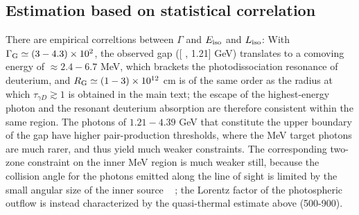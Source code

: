 \documentclass[prd,twocolumn,amsmath,amssymb,aps,linenumbers]{revtex4-2} %
\providecommand{\DIFaddtex}[1]{{\protect\color{blue} \sf #1}} %
\providecommand{\DIFdeltex}[1]{{\protect\color{red} \scriptsize #1}} %
\providecommand{\DIFaddbegin}{} %
\providecommand{\DIFaddend}{} %
\providecommand{\DIFdelbegin}{} %
\providecommand{\DIFdelend}{} %
\providecommand{\DIFadd}[1]{\texorpdfstring{\DIFaddtex{#1}}{#1}} %
\providecommand{\DIFdel}[1]{\texorpdfstring{\DIFdeltex{#1}}{}} %
\newcommand{\DIFscaledelfig}{0.5}
\newlength{\DIFdelgraphicswidth} %
\newlength{\DIFdelgraphicsheight} %
\newcommand{\DIFaddincludegraphics}[2][]{{\color{blue}\fbox{\DIFOincludegraphics[#1]{#2}}}} %
\newcommand{\DIFdelincludegraphics}[2][]{%
\sbox{\DIFdelgraphicsbox}{\DIFOincludegraphics[#1]{#2}}%
\settoboxwidth{\DIFdelgraphicswidth}{\DIFdelgraphicsbox} %
\settoboxtotalheight{\DIFdelgraphicsheight}{\DIFdelgraphicsbox} %
\scalebox{\DIFscaledelfig}{%
\parbox[b]{\DIFdelgraphicswidth}{\usebox{\DIFdelgraphicsbox}\\[-\baselineskip] \rule{\DIFdelgraphicswidth}{0em}}\llap{\resizebox{\DIFdelgraphicswidth}{\DIFdelgraphicsheight}{%
\setlength{\unitlength}{\DIFdelgraphicswidth}%
\begin{picture}(1,1)%
\thicklines\linethickness{2pt} %
{\color[rgb]{1,0,0}\put(0,0){\framebox(1,1){}}}%
{\color[rgb]{1,0,0}\put(0,0){\line( 1,1){1}}}%
{\color[rgb]{1,0,0}\put(0,1){\line(1,-1){1}}}%
\end{picture}%
}\hspace*{3pt}}} %
} %
\DeclareRobustCommand{\DIFaddbegin}{\DIFOaddbegin \let\includegraphics\DIFaddincludegraphics} %
\DeclareRobustCommand{\DIFaddend}{\DIFOaddend \let\includegraphics\DIFOincludegraphics} %
\DeclareRobustCommand{\DIFdelbegin}{\DIFOdelbegin \let\includegraphics\DIFdelincludegraphics} %
\DeclareRobustCommand{\DIFdelend}{\DIFOaddend \let\includegraphics\DIFOincludegraphics} %
\begin{document}
\DIFdelbegin \subsection{\DIFdel{Estimation based on statistical correlation}}
\addtocounter{subsection}{-1}%
\DIFdel{There are empirical correltions between $\Gamma$ and $E_{\rm iso}$ and $L_{\rm iso}$:
}\DIFdelend \DIFaddbegin \DIFadd{With $\Gamma_{\rm G}\simeq(3-4.3)\times10^{2}$, the observed gap (}[\DIFadd{0.62, 1.21}] \DIFadd{GeV) translates to a comoving energy of $\approx2.4-6.7$ MeV, which brackets the photodissociation resonance of deuterium, and $R_{\rm G}\simeq(1-3)\times10^{12}$ cm is of the same order as the radius at which $\tau_{\gamma D}\gtrsim1$ is obtained in the main text; the escape of the highest-energy photon and the resonant deuterium absorption are therefore consistent within the same region. The photons of $1.21-4.39$ GeV that constitute the upper boundary of the gap have higher pair-production thresholds, where the MeV target photons are much rarer, and thus yield much weaker constraints. The corresponding two-zone constraint on the inner MeV region is much weaker still, because the collision angle for the photons emitted along the line of sight is limited by the small angular size of the inner source \mbox{%
\citep{2011ApJ...726L...2Z}}\hskip0pt%
; the Lorentz factor of the photospheric outflow is instead characterized by the quasi-thermal estimate above (500-900).
}

\DIFaddend 
\end{document}
